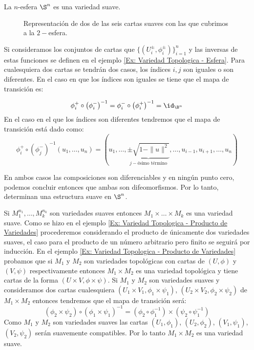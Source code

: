 \begin{example}[$n-$Esfera]
	La $n$-esfera $\S^n$ es una variedad suave.

	\begin{figure}[h]
		\begin{center}
			
			\caption{Representación de dos de las seis cartas suaves con las que cubrimos a la $2-$esfera.}
		\end{center}
	\end{figure}

	Si consideramos los conjuntos de cartas que $\{(U_i^{\pm}, \phi_{i}^{\pm})\}_{i=1}^{n}$ y las inversas de estas funciones se definen en el ejemplo \ref{Ex: Variedad Topologica - Esfera}. Para cualesquiera dos cartas se tendrán dos casos, los índices $i,j$ son iguales o son diferentes. En el caso en que los índices son iguales se tiene que el mapa de transición es:

	\[ \phi_i^{+} \circ \left(\phi_{i}^{-}\right)^{-1} = \phi_i^{-} \circ \left(\phi_{i}^{+}\right)^{-1} = \id_{\B^n} \]
	En el caso en el que los índices son diferentes tendremos que el mapa de transición está dado como:
	\[ \phi_i^{+} \circ \left(\phi_{j}^{-}\right)^{-1}(u_1, \dots, u_n) = \left(u_1, \dots, \underbrace{\pm \sqrt{1 - \|u\|^2}}_{j-\text{ésimo término}},\dots, u_{i-1}, u_{i+1}, \dots, u_{n} \right) \]

	En ambos casos las composiciones son diferenciables y en ningún punto cero, podemos concluir entonces que ambas son difeomorfismos. Por lo tanto, determinan una estructura suave en $\S^n$.
\end{example}

\begin{example}\label{Ex: Variedad Suave - Producto de Variedades Suaves}
	Si $M_1^{n_1},\dots,M_k^{n_k}$ son variedades suaves entonces $M_1 \times \dots \times M_k$ es una variedad suave. Como se hizo en el ejemplo \ref{Ex: Variedad Topologica - Producto de Variedades} procederemos considerando el producto de únicamente dos variedades suaves, el caso para el producto de un número arbitrario pero finito se seguirá por inducción.
	En el ejemplo \ref{Ex: Variedad Topologica - Producto de Variedades} probamos que si $M_1$ y $M_2$ son variedades topológicas con cartas de $(U,\phi)$ y $(V,\psi)$ respectivamente entonces $M_1 \times M_2$ es una variedad topológica y tiene cartas de la forma $(U \times V,\phi \times \psi)$. Si $M_1$ y $M_2$ son variedades suaves y consideramos dos cartas cualesquiera $(U_1 \times V_1, \phi_1 \times \psi_1)$, $(U_2 \times V_2, \phi_2 \times \psi_2)$ de $M_1 \times M_2$ entonces tendremos que el mapa de transición será:
	\[
		(\phi_2 \times \psi_2) \circ (\phi_1 \times \psi_1)^{-1} = (\phi_2 \circ \phi_1^{-1}) \times (\psi_2 \circ \psi_1^{-1})
	\]
	Como $M_1$ y $M_2$ son variedades suaves las cartas $(U_1,\phi_1)$, $(U_2,\phi_2)$, $(V_1,\psi_1)$, $(V_2,\psi_2)$ serán suavemente compatibles. Por lo tanto $M_1 \times M_2$ es una variedad suave.
\end{example}

